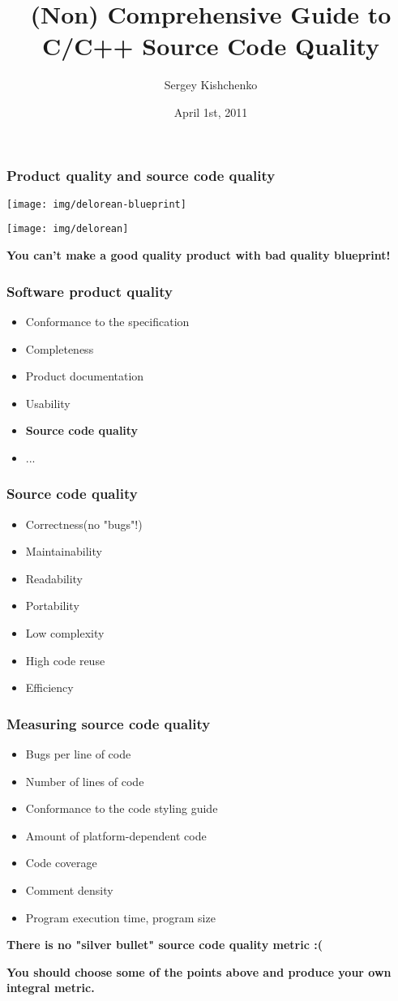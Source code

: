 \documentclass{beamer}
\title{(Non) Comprehensive Guide to C/C++ Source Code Quality}
\author{Sergey Kishchenko}
\date{April 1st, 2011}
\institute{Quickoffice}
\begin{document}
\frame{\titlepage}
\begin{frame}
\frametitle{Product quality and source code quality}
\begin{multicols}{2}

\texttt{[image: img/delorean-blueprint]}
\columnbreak
{}

\texttt{[image: img/delorean]}
\end{multicols}
\begin{center}
\textbf{You can't make a good quality product with bad quality blueprint!}
\end{center}
\end{frame}

\begin{frame}
\frametitle{Software product quality}
\begin{itemize}
\item Conformance to the specification
\item Completeness
\item Product documentation
\item Usability
\item \textbf{Source code quality}
\item ...
\end{itemize}
\end{frame}

\begin{frame}
\frametitle{Source code quality}
\begin{itemize}
\item Correctness(no "bugs"!)
\item Maintainability
\item Readability
\item Portability
\item Low complexity
\item High code reuse
\item Efficiency
\end{itemize}
\end{frame}

\begin{frame}
\frametitle{Measuring source code quality}
\begin{itemize}
\item Bugs per line of code
\item Number of lines of code
\item Conformance to the code styling guide
\item Amount of platform-dependent code
\item Code coverage
\item Comment density
\item Program execution time, program size
\end{itemize}
\begin{center}
\textbf{There is no "silver bullet" source code quality metric :(}

\textbf{You should choose some of the points above and produce your own integral metric.}
\end{center}
\end{frame}
\end{document}
